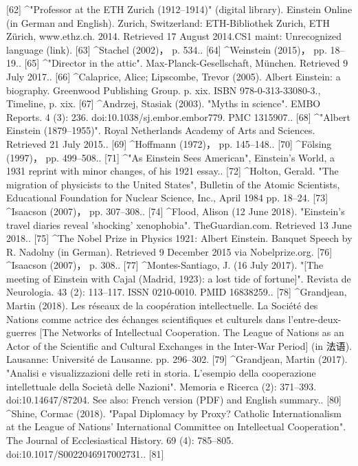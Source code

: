 [62]
^"Professor at the ETH Zurich (1912–1914)" (digital library). Einstein Online (in German and English). Zurich, Switzerland: ETH-Bibliothek Zurich, ETH Zürich, www.ethz.ch. 2014. Retrieved 17 August 2014.CS1 maint: Unrecognized language (link).
[63]
^Stachel (2002)， p. 534..
[64]
^Weinstein (2015)， pp. 18–19..
[65]
^"Director in the attic". Max-Planck-Gesellschaft, München. Retrieved 9 July 2017..
[66]
^Calaprice, Alice; Lipscombe, Trevor (2005). Albert Einstein: a biography. Greenwood Publishing Group. p. xix. ISBN 978-0-313-33080-3., Timeline, p. xix.
[67]
^Andrzej, Stasiak (2003). "Myths in science". EMBO Reports. 4 (3): 236. doi:10.1038/sj.embor.embor779. PMC 1315907..
[68]
^"Albert Einstein (1879–1955)". Royal Netherlands Academy of Arts and Sciences. Retrieved 21 July 2015..
[69]
^Hoffmann (1972)， pp. 145–148..
[70]
^Fölsing (1997)， pp. 499–508..
[71]
^"As Einstein Sees American", Einstein's World, a 1931 reprint with minor changes, of his 1921 essay..
[72]
^Holton, Gerald. "The migration of physicists to the United States", Bulletin of the Atomic Scientists, Educational Foundation for Nuclear Science, Inc., April 1984 pp. 18–24.
[73]
^Isaacson (2007)， pp. 307–308..
[74]
^Flood, Alison (12 June 2018). "Einstein's travel diaries reveal 'shocking' xenophobia". TheGuardian.com. Retrieved 13 June 2018..
[75]
^The Nobel Prize in Physics 1921: Albert Einstein. Banquet Speech by R. Nadolny (in German). Retrieved 9 December 2015 via Nobelprize.org.
[76]
^Isaacson (2007)， p. 308..
[77]
^Montes-Santiago, J. (16 July 2017). "[The meeting of Einstein with Cajal (Madrid, 1923): a lost tide of fortune]". Revista de Neurologia. 43 (2): 113–117. ISSN 0210-0010. PMID 16838259..
[78]
^Grandjean, Martin (2018). Les réseaux de la coopération intellectuelle. La Société des Nations comme actrice des échanges scientifiques et culturels dans l'entre-deux-guerres [The Networks of Intellectual Cooperation. The League of Nations as an Actor of the Scientific and Cultural Exchanges in the Inter-War Period] (in 法语). Lausanne: Université de Lausanne. pp. 296–302.
[79]
^Grandjean, Martin (2017). "Analisi e visualizzazioni delle reti in storia. L'esempio della cooperazione intellettuale della Società delle Nazioni". Memoria e Ricerca (2): 371–393. doi:10.14647/87204. See also: French version (PDF) and English summary..
[80]
^Shine, Cormac (2018). "Papal Diplomacy by Proxy? Catholic Internationalism at the League of Nations' International Committee on Intellectual Cooperation". The Journal of Ecclesiastical History. 69 (4): 785–805. doi:10.1017/S0022046917002731..
[81]
